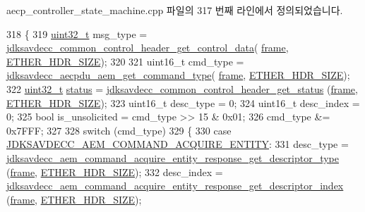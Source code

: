 aecp\+\_\+controller\+\_\+state\+\_\+machine.\+cpp 파일의 317 번째 라인에서 정의되었습니다.


\begin{DoxyCode}
318 \{
319     \hyperlink{parse_8c_a6eb1e68cc391dd753bc8ce896dbb8315}{uint32\_t} msg\_type = 
      \hyperlink{group__jdksavdecc__avtp__common__control__header_gacb435e5d647474931972cb9eb93b4e41}{jdksavdecc\_common\_control\_header\_get\_control\_data}(
      \hyperlink{gst__avb__playbin_8c_ac8e710e0b5e994c0545d75d69868c6f0}{frame}, \hyperlink{namespaceavdecc__lib_a6c827b1a0d973e18119c5e3da518e65ca9512ad9b34302ba7048d88197e0a2dc0}{ETHER\_HDR\_SIZE});
320 
321     uint16\_t cmd\_type = \hyperlink{group__aecpdu__aem_ga61a282324f09f449059b9fe710363710}{jdksavdecc\_aecpdu\_aem\_get\_command\_type}(
      \hyperlink{gst__avb__playbin_8c_ac8e710e0b5e994c0545d75d69868c6f0}{frame}, \hyperlink{namespaceavdecc__lib_a6c827b1a0d973e18119c5e3da518e65ca9512ad9b34302ba7048d88197e0a2dc0}{ETHER\_HDR\_SIZE});
322     \hyperlink{parse_8c_a6eb1e68cc391dd753bc8ce896dbb8315}{uint32\_t} \hyperlink{structjdksavdecc__aecpdu__common__control__header_ade818037fd6c985038ff29656089758d}{status} = \hyperlink{group__jdksavdecc__avtp__common__control__header_ga4a4d44fa74bdb873eab982d74862273c}{jdksavdecc\_common\_control\_header\_get\_status}
      (\hyperlink{gst__avb__playbin_8c_ac8e710e0b5e994c0545d75d69868c6f0}{frame}, \hyperlink{namespaceavdecc__lib_a6c827b1a0d973e18119c5e3da518e65ca9512ad9b34302ba7048d88197e0a2dc0}{ETHER\_HDR\_SIZE});
323     uint16\_t desc\_type = 0;
324     uint16\_t desc\_index = 0;
325     \textcolor{keywordtype}{bool} is\_unsolicited = cmd\_type >> 15 & 0x01;
326     cmd\_type &= 0x7FFF;
327 
328     \textcolor{keywordflow}{switch} (cmd\_type)
329     \{
330     \textcolor{keywordflow}{case} \hyperlink{group__command_ga74ebee0a0531409bb10f7ce9e1216c04}{JDKSAVDECC\_AEM\_COMMAND\_ACQUIRE\_ENTITY}:
331         desc\_type = 
      \hyperlink{group__command__acquire__entity__response_ga89a79f0364a5e4c2487f48fe4cf53dd2}{jdksavdecc\_aem\_command\_acquire\_entity\_response\_get\_descriptor\_type}
      (\hyperlink{gst__avb__playbin_8c_ac8e710e0b5e994c0545d75d69868c6f0}{frame}, \hyperlink{namespaceavdecc__lib_a6c827b1a0d973e18119c5e3da518e65ca9512ad9b34302ba7048d88197e0a2dc0}{ETHER\_HDR\_SIZE});
332         desc\_index = 
      \hyperlink{group__command__acquire__entity__response_ga250a3521fec9da2e6b8dd42cb3efdef8}{jdksavdecc\_aem\_command\_acquire\_entity\_response\_get\_descriptor\_index}
      (\hyperlink{gst__avb__playbin_8c_ac8e710e0b5e994c0545d75d69868c6f0}{frame}, \hyperlink{namespaceavdecc__lib_a6c827b1a0d973e18119c5e3da518e65ca9512ad9b34302ba7048d88197e0a2dc0}{ETHER\_HDR\_SIZE});

\end{DoxyCode}
